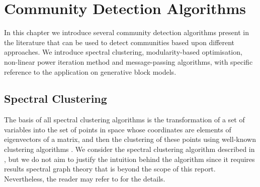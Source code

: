 
\chapter{Community Detection Algorithms}

\label{cha:communityDetectionAlgorithms}


In this chapter we introduce several community detection algorithms present in the literature that can be used to detect communities based upon different approaches.
We introduce spectral clustering, modularity-based optimisation, non-linear power iteration method and message-passing algorithms, with specific reference to the application on generative block models.


\section{Spectral Clustering}
\label{sec:spectralClustering}

The basis of all spectral clustering algorithms is the transformation of a set of variables into the set of points in space whose coordinates are elements of eigenvectors of a matrix, and then the clustering of these points using well-known clustering algorithms \cite{Lux06,For10}.
We consider the spectral clustering algorithm described in \cite{Lux06,For10}, but we do not aim to justify the intuition behind the algorithm since it requires results spectral graph theory that is beyond the scope of this report.
Nevertheless, the reader may refer to \cite{Lux06,Spi07,For10} for the details.

